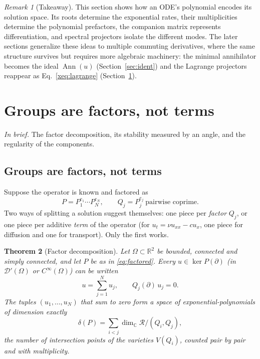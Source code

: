 \documentclass[11pt]{article}
\theoremstyle{plain}
\newtheorem{theorem}{Theorem}[section]
\theoremstyle{definition}
\theoremstyle{remark}
\newtheorem{remark}[theorem]{Remark}
\newcommand{\R}{\mathbb{R}}
\newcommand{\C}{\mathbb{C}}
\newcommand{\ring}{\mathcal{R}}            %
\DeclareMathOperator{\Ann}{Ann}             %
\newcommand{\Var}{V}                        %
\newcommand{\deltaP}{\delta(P)}             %
\newcommand{\inbrief}[1]{\par\smallskip\noindent\emph{In brief.} #1\par\smallskip}
\newenvironment{keypoint}{\begin{remark}[Takeaway]}{\end{remark}}
\begin{document}
\begin{keypoint}
This section shows how an ODE's polynomial encodes its solution space. Its roots determine the exponential rates, their multiplicities determine the polynomial prefactors, the companion matrix represents differentiation, and spectral projectors isolate the different modes. The later sections generalize these ideas to multiple commuting derivatives, where the same structure survives but requires more algebraic machinery: the minimal annihilator becomes the ideal $\Ann(u)$ (Section~\ref{sec:ident}) and the Lagrange projectors reappear as Eq.~\eqref{xeq:lagrange} (Section~\ref{sec:groups}).
\end{keypoint}




\section{Groups are factors, not terms}\label{sec:groups}\label{ch:decomp}
\inbrief{The factor decomposition, its stability measured by an angle, and the regularity of the components.}

\subsection{Groups are factors, not terms}\label{sec:factor}
Suppose the operator is known and factored as
\begin{equation}\label{eq:factored}
  P=P_1^{e_1}\cdots P_N^{e_N},\qquad Q_j=P_j^{e_j}\ \text{pairwise coprime}.
\end{equation}
Two ways of splitting a solution suggest themselves: one piece per \emph{factor} $Q_j$, or one piece
per additive \emph{term} of the operator (for $u_t=\nu u_{xx}-cu_x$, one piece for diffusion and one
for transport). Only the first works.

\begin{theorem}[Factor decomposition]\label{thm:factor}
Let $\Omega\subset\R^2$ be bounded, connected and simply connected, and let $P$ be as in
\eqref{eq:factored}. Every $u\in\ker P(\partial)$ (in $\mathcal D'(\Omega)$ or $C^\infty(\Omega)$) can be
written
\begin{equation}\label{eq:decomp}
  u=\sum_{j=1}^N u_j,\qquad Q_j(\partial)\,u_j=0 .
\end{equation}
The tuples $(u_1,\dots,u_N)$ that sum to zero form a space of exponential-polynomials of dimension
exactly
\begin{equation}\label{eq:deltaP}
  \deltaP=\sum_{i<j}\dim_\C\ring/(Q_i,Q_j),
\end{equation}
the number of intersection points of the varieties $\Var(Q_i)$, counted pair by pair and with multiplicity.
\end{theorem}
\end{document}
